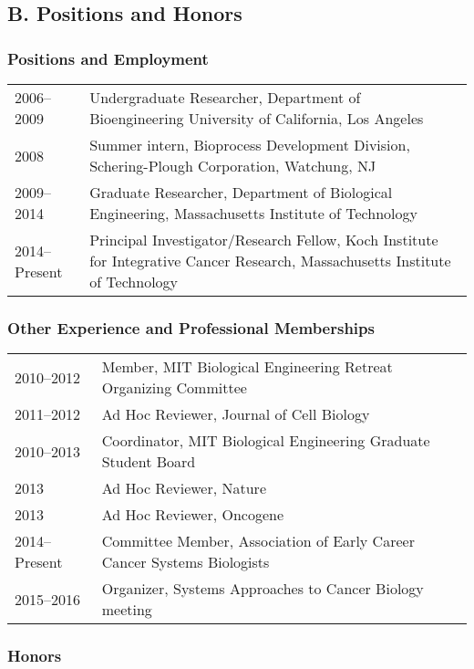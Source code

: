 \documentclass[11pt]{article}
\begin{document}
\subsection{B. Positions and Honors}

\subsubsection{Positions and Employment}

\begin{tabular}{p{1.1in}p{6.1in}}
  2006--2009 & Undergraduate Researcher, Department of Bioengineering
		University of California, Los Angeles\\
  2008 & Summer intern, Bioprocess Development Division, Schering-Plough Corporation, Watchung, NJ \\
  2009--2014 & Graduate Researcher, Department of Biological Engineering, Massachusetts Institute of Technology \\
  2014--Present & Principal Investigator/Research Fellow, Koch Institute for Integrative Cancer Research, Massachusetts Institute of Technology
\end{tabular}



\subsubsection{Other Experience and Professional Memberships}

\begin{tabular}{p{1.1in}p{6.1in}}
2010--2012 & Member, MIT Biological Engineering Retreat Organizing Committee\\
2011--2012 & Ad Hoc Reviewer, Journal of Cell Biology\\
2010--2013 & Coordinator, MIT Biological Engineering Graduate Student Board\\
2013 & Ad Hoc Reviewer, Nature\\
2013 & Ad Hoc Reviewer, Oncogene\\
2014--Present & Committee Member, Association of Early Career Cancer Systems Biologists\\
2015--2016 & Organizer, Systems Approaches to Cancer Biology meeting\\
\end{tabular}


\subsubsection{Honors}
\end{document}
